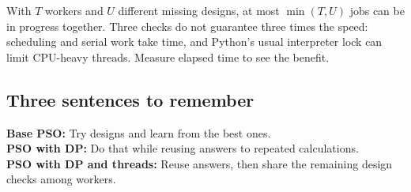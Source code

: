 \documentclass[11pt,a4paper]{article}
\begin{document}
With $T$ workers and $U$ different missing designs, at most $\min(T,U)$ jobs
can be in progress together. Three checks do not guarantee three times the
speed: scheduling and serial work take time, and Python's usual interpreter
lock can limit CPU-heavy threads. Measure elapsed time to see the benefit.

\subsection*{Three sentences to remember}
\textbf{Base PSO:} Try designs and learn from the best ones.\\
\textbf{PSO with DP:} Do that while reusing answers to repeated calculations.\\
\textbf{PSO with DP and threads:} Reuse answers, then share the remaining
design checks among workers.
\end{document}
